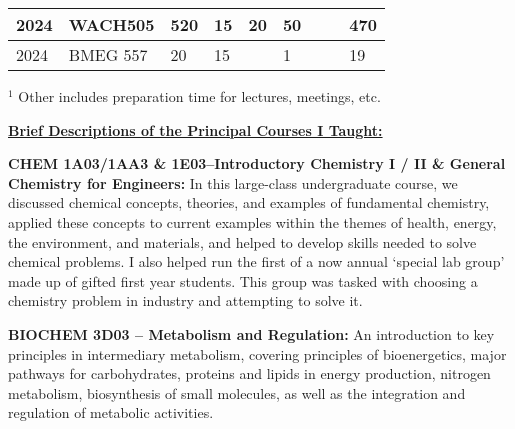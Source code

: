 \documentclass[11pt,notitlepage,english]{report}
\begin{document}
\begin{table}[H]
\begin{tabular}{|l|l|l|l|l|l|l|l|l|}
    2024                                                 & WACH505                                                                                                         & 520                                                  & 15                                                        & 20                                                         & 50                                   &                                   &                                   & 470                                 \\ \hline
    2024                                                 & BMEG 557                                                                                                        & 20                                                   & 15                                                        &                                                            & 1                                    &                                   &                                   & 19                                  \\ \hline
  \end{tabular}
\end{table}
\vspace{-10pt}
$^{1}$ Other includes preparation time for lectures, meetings, etc.

\vspace{10pt}
\textbf{\underline{Brief Descriptions of the Principal Courses I Taught: }}

\vspace{5pt}

\textbf{CHEM 1A03/1AA3 \& 1E03–Introductory Chemistry I / II \& General Chemistry for Engineers:} In this large-class undergraduate course, we discussed chemical concepts, theories, and examples of fundamental chemistry, applied these concepts to current examples within the themes of health, energy, the environment, and materials, and helped to develop skills needed to solve chemical problems. I also helped run the first of a now annual ‘special lab group’ made up of gifted first year students. This group was tasked with choosing a chemistry problem in industry and attempting to solve it.

\vspace{5pt}

\textbf{BIOCHEM 3D03 – Metabolism and Regulation:} An introduction to key principles in intermediary metabolism, covering principles of bioenergetics, major pathways for carbohydrates, proteins and lipids in energy production, nitrogen metabolism, biosynthesis of small molecules, as well as the integration and regulation of metabolic activities.
\end{document}
